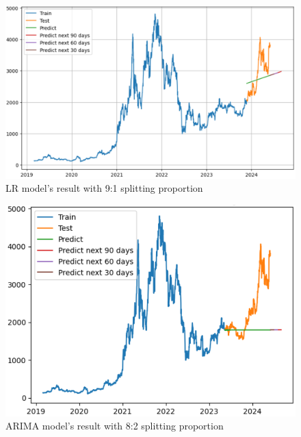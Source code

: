 \documentclass{ieeeojies}
\begin{document}
\begin{figure}[H]
	\centering
	\begin{minipage}{0.6\linewidth}
		\centering
		\includegraphics[width=\linewidth]{bibliography/Images/LR_ETH_91.PNG}
		\caption{LR model's result with 9:1 splitting proportion}
	\end{minipage}
\end{figure}
\begin{figure}[H]
	\centering
	\begin{minipage}{0.6\linewidth}
		\centering
		\includegraphics[width=\linewidth]{bibliography/Images/ARIMA_ETH_82.PNG}
		\caption{ARIMA model's result with 8:2 splitting proportion}
	\end{minipage}
\end{figure}
\end{document}
